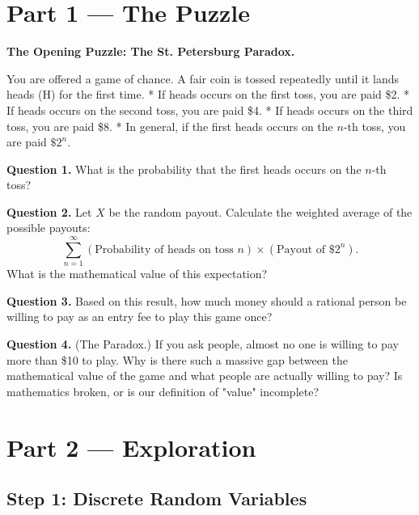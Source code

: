 \documentclass[12pt, a4paper]{article}
\begin{document}
\newpage

\section{Part 1 \texorpdfstring{---}{--} The Puzzle}

\begin{puzzlebox}
\textbf{The Opening Puzzle: The St. Petersburg Paradox.}

You are offered a game of chance. A fair coin is tossed repeatedly until it lands heads (H) for the first time.
* If heads occurs on the first toss, you are paid \$2.
* If heads occurs on the second toss, you are paid \$4.
* If heads occurs on the third toss, you are paid \$8.
* In general, if the first heads occurs on the $n$-th toss, you are paid $\$2^n$.

\medskip
\textbf{Question 1.} What is the probability that the first heads occurs on the $n$-th toss?

\textbf{Question 2.} Let $X$ be the random payout. Calculate the weighted average of the possible payouts:
\[
  \sum_{n=1}^\infty (\text{Probability of heads on toss } n) \times (\text{Payout of } \$2^n).
\]
What is the mathematical value of this expectation?

\textbf{Question 3.} Based on this result, how much money should a rational person be willing to pay as an entry fee to play this game once?

\textbf{Question 4.} (The Paradox.) If you ask people, almost no one is willing to pay more than \$10 to play. Why is there such a massive gap between the mathematical value of the game and what people are actually willing to pay? Is mathematics broken, or is our definition of "value" incomplete?
\end{puzzlebox}

\newpage

\section{Part 2 \texorpdfstring{---}{--} Exploration}

\subsection{Step 1: Discrete Random Variables}
\end{document}
